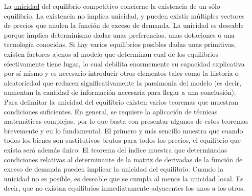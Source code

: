 \documentclass{nuevotema}
\begin{document}
La \underline{unicidad} del equilibrio competitivo concierne la existencia de un sólo equilibrio. La existencia no implica unicidad, y pueden existir múltiples vectores de precios que anulen la función de exceso de demanda. La unicidad es deseable porque implica determinismo dadas unas preferencias, unas dotaciones o una tecnología conocidas. Si hay varios equilibrios posibles dadas unas primitivas, existen factores ajenos al modelo que determinan cual de los equilibrios efectivamente tiene lugar, lo cual debilita enormemente su capacidad explicativa por sí mismo y es necesario introducir otros elementos tales como la historia o aleatoriedad que reducen significativamente la parsimonia del modelo (es decir, aumentan la cantidad de información necesaria para llegar a una conclusión). Para delimitar la unicidad del equilibrio existen varios teoremas que muestran condiciones suficientes. En general, se requiere la aplicación de técnicas matemáticas complejas, por lo que basta con presentar algunos de estos teoremas brevemente y en lo fundamental. El primero y más sencillo muestra que cuando todos los bienes son sustitutivos brutos para todos los precios, el equilibrio que exista será además único. El teorema del índice muestra que determinadas condiciones relativas al determinante de la matriz de derivadas de la función de exceso de demanda pueden implicar la unicidad del equilibrio. Cuando la unicidad no es posible, es deseable que se cumpla al menos la unicidad local. Es decir, que no existan equilibrios inmediatamente adyacentes los unos a los otros.
\end{document}
